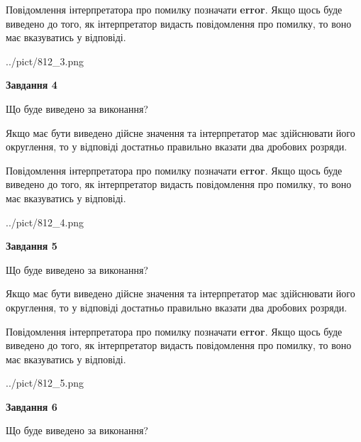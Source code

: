 \documentclass[12pt, ukrainian]{article}
\begin{document}
{\begin {Large}
Повідомлення інтерпретатора про помилку позначати \textbf{error}.
Якщо щось буде виведено до того, як інтерпретатор видасть повідомлення про помилку, 
то воно має вказуватись у відповіді. \par

\begin{center}
	{../pict/812_3.png}
\end{center}
\newpage

{\begin {center}\textbf{Завдання 4}\end {center}}\par
Що буде виведено за виконання? \par

Якщо має бути виведено дійсне значення та інтерпретатор має здійснювати його округлення, 
то у відповіді достатньо правильно вказати два дробових розряди.

Повідомлення інтерпретатора про помилку позначати \textbf{error}.
Якщо щось буде виведено до того, як інтерпретатор видасть повідомлення про помилку, 
то воно має вказуватись у відповіді. \par

\begin{center}
	{../pict/812_4.png}
\end{center}
\newpage

{\begin {center}\textbf{Завдання 5}\end {center}}\par
Що буде виведено за виконання? \par

Якщо має бути виведено дійсне значення та інтерпретатор має здійснювати його округлення, 
то у відповіді достатньо правильно вказати два дробових розряди.

Повідомлення інтерпретатора про помилку позначати \textbf{error}.
Якщо щось буде виведено до того, як інтерпретатор видасть повідомлення про помилку, 
то воно має вказуватись у відповіді. \par

\begin{center}
	{../pict/812_5.png}
\end{center}
\newpage

{\begin {center}\textbf{Завдання 6}\end {center}}\par
Що буде виведено за виконання? \par


\end{Large}}
\end{document}
